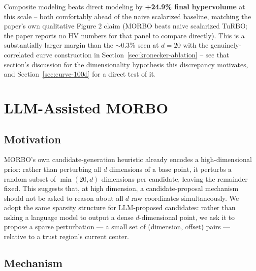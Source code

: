 \documentclass[11pt]{article}
\begin{document}
Composite modeling beats direct modeling by \textbf{+24.9\% final
hypervolume} at this scale -- both comfortably ahead of the naive scalarized
baseline, matching the paper's own qualitative Figure 2 claim (MORBO beats
naive scalarized TuRBO; the paper reports no HV numbers for that panel to
compare directly). This is a substantially larger margin than the
$\sim$0.3\% seen at $d=20$ with the genuinely-correlated curve construction
in Section~\ref{sec:kronecker-ablation} -- see that section's discussion for
the dimensionality hypothesis this discrepancy motivates, and
Section~\ref{sec:curve-100d} for a direct test of it.

\section{LLM-Assisted MORBO}
\label{sec:llm-morbo}

\subsection{Motivation}

MORBO's own candidate-generation heuristic already encodes a
high-dimensional prior: rather than perturbing all $d$ dimensions of a
base point, it perturbs a random subset of $\min(20, d)$ dimensions per
candidate, leaving the remainder fixed. This suggests that, at high
dimension, a candidate-proposal mechanism should not be asked to reason
about all $d$ raw coordinates simultaneously. We adopt the same sparsity
structure for LLM-proposed candidates: rather than asking a language model
to output a dense $d$-dimensional point, we ask it to propose a sparse
perturbation --- a small set of (dimension, offset) pairs --- relative to a
trust region's current center.

\subsection{Mechanism}
\end{document}
